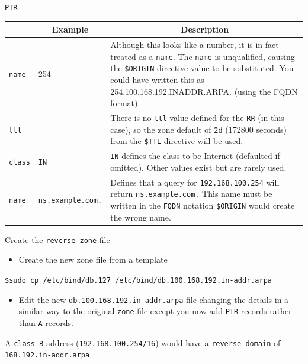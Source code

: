 \documentclass[xcolor=table,aspectratio=169]{beamer}
\begin{document}
\begin{frame}{\texttt{PTR}}
  \begin{table}
    \tiny
    \begin{tabular}{|p{1.6cm}|p{1.6cm}|p{4.7cm}|} 
      \hline
      \rowcolor{gray}
      \multicolumn{1}{|c|}{Syntax} & \multicolumn{1}{c|}{Example} & \multicolumn{1}{c|}{Description}\\ 
      \hline
      \texttt{name}&254&Although this looks like a number, it is in fact treated as a \texttt{name}. The \texttt{name} is unqualified, causing the \texttt{\$ORIGIN} directive value to be substituted. You could have written this as 254.100.168.192.INADDR.ARPA. (using the FQDN format).\\
      \hline
      \texttt{ttl}&&There is no \texttt{ttl} value defined for the \texttt{RR} (in this case), so the zone default of \texttt{2d} (172800 seconds) from the \texttt{\$TTL} directive will be used.\\
      \hline
      \texttt{class}&\texttt{IN}&\texttt{IN} defines the class to be Internet (defaulted if omitted). Other values exist but are rarely used.\\
      \hline
      \texttt{name}&\texttt{ns.example.com.}&Defines that a query for \texttt{192.168.100.254} will return \texttt{ns.example.com.} This name must be written in the \texttt{FQDN} notation \texttt{\$ORIGIN} would create the wrong name.\\
      \hline
    \end{tabular}
  \end{table}
\end{frame}

\begin{frame}{Create the \texttt{reverse zone} file}
  \begin{itemize}
    \item Create the new zone file from a template
  \end{itemize}
  \begin{tcolorbox}
    \begin{center}
      \texttt{\scriptsize\$sudo cp /etc/bind/db.127 /etc/bind/db.100.168.192.in-addr.arpa}
    \end{center}
  \end{tcolorbox}
  \begin{itemize}
    \item  Edit the new \texttt{db.100.168.192.in-addr.arpa} file changing the details in a similar way to the original \texttt{zone} file except you now add \texttt{PTR} records rather than \texttt{A} records.
  \end{itemize}
  \begin{tcolorbox}[title={\textbf{NOTE:}}]
    \begin{center}
      \scriptsize A \texttt{class B} address (\texttt{192.168.100.254/16}) would have a \texttt{reverse domain} of \texttt{168.192.in-addr.arpa}
    \end{center}
  \end{tcolorbox}
\end{frame}
\end{document}
